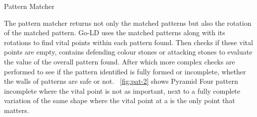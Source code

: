 \documentclass{l4proj}
\begin{document}
\begin{algorithm}[H]
\caption{Pattern Matcher}\label{Pattern Matcher}
    \DontPrintSemicolon
\end{algorithm}

The pattern matcher returns not only the matched patterns but also the rotation of the matched pattern. Go-LD uses the matched patterns along with its rotations to find vital points within each pattern found. Then checks if these vital points are empty, contains defending colour stones or attacking stones to evaluate the value of the overall pattern found. After which more complex checks are performed to see if the pattern identified is fully formed or incomplete, whether the walls of patterns are safe or not. ~\autoref{fig:pat-2} shows Pyramid Four pattern incomplete where the vital point is not as important, next to a fully complete variation of the same shape where the vital point at a is the only point that matters.
\end{document}

